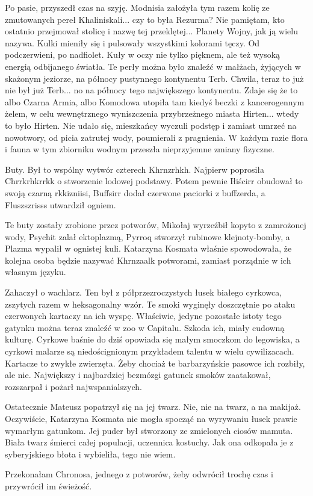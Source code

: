 Po pasie, przyszedł czas na szyję. Modnisia założyła tym razem kolię ze zmutowanych pereł Khaliniskali...
czy to była Rezurma? Nie pamiętam, kto ostatnio przejmował stolicę i nazwę tej przeklętej... Planety Wojny, jak ją wielu nazywa.
Kulki mieniły się i pulsowały wszystkimi kolorami tęczy. Od podczerwieni, po nadfiolet. Kuły w oczy nie tylko pięknem, ale też wysoką energią odbijanego światła.
Te perły można było znaleźć w małżach, żyjących w skażonym jeziorze, na północy pustynnego kontynentu Terb. Chwila, teraz to już nie był już Terb... no na północy tego największego kontynentu.
Zdaje się że to albo Czarna Armia, albo Komodowa utopiła tam kiedyś beczki z kancerogennym żelem, w celu wewnętrznego wyniszczenia przybrzeżnego miasta Hirten... wtedy to było Hirten.
Nie udało się, mieszkańcy wyczuli podstęp i zamiast umrzeć na nowotwory, od picia zatrutej wody, poumierali z pragnienia.
W każdym razie flora i fauna w tym zbiorniku wodnym przeszła nieprzyjemne zmiany fizyczne.

Buty. Był to wspólny wytwór czterech Khrnzrhkh.
Najpierw poprosiła Chrrkrhkrrkk o stworzenie lodowej podstawy.
Potem pewnie Iłiścirr obudował to swoją czarną rkkizniisi, Buffsirr dodał czerwone paciorki z buffzerda, a Fluszszrisss utwardził ogniem.
\begin{dialogue}
\ds{} Te buty zostały zrobione przez potworów, Mikołaj wyrzeźbił kopyto z zamrożonej wody, Psychit zalał ektoplazmą, Pyrroq stworzył rubinowe klejnoty-bomby, a Plazma wypalił w ognistej kuli. \dm{}
Katarzyna Kosmata właśnie spowodowała, że kolejna osoba będzie nazywać Khrnzaalk potworami, zamiast porządnie w ich własnym języku.
\end{dialogue}

Zahaczył o wachlarz.
Ten był z półprzezroczystych łusek białego cyrkowca, zszytych razem w heksagonalny wzór.
Te smoki wyginęły doszczętnie po ataku czerwonych kartaczy na ich wyspę.
Właściwie, jedyne pozostałe istoty tego gatynku można teraz znaleźć w zoo w Capitalu.
Szkoda ich, miały cudowną kulturę.
Cyrkowe baśnie do dziś opowiada się małym smoczkom do legowiska, a cyrkowi malarze są niedoścignionym przykładem talentu w wielu cywilizacach.
Kartacze to zwykłe zwierzęta. Żeby chociaż te barbarzyńskie pasowce ich rozbiły, ale nie. 
Największy i najbardziej bezmózgi gatunek smoków zaatakował, rozszarpał i pożarł najwspanialszych.

Ostatecznie Mateusz popatrzył się na jej twarz.
Nie, nie na twarz, a na makijaż.
Oczywiście, Katarzyna Kosmata nie mogła spocząć na wyrywaniu łusek prawie wymarłym gatunkom.
Jej puder był stworzony ze zmielonych ciosów mamuta. Biała twarz śmierci całej populacji, uczennica kostuchy.
Jak ona odkopała je z syberyjskiego błota i wybieliła, tego nie wiem.
\begin{dialogue}
\ds{} Przekonałam Chronosa, jednego z potworów, żeby odwrócił trochę czas i przywrócił im świeżość.
\end{dialogue}

